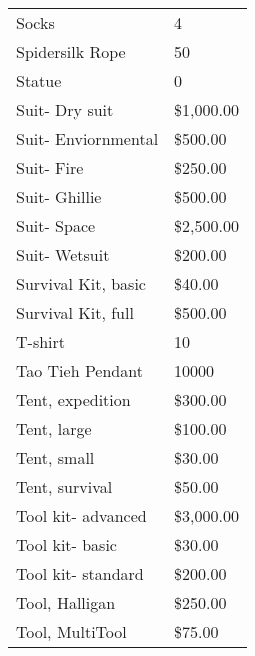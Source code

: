 \documentclass[twoside]{book}
\begin{document}
\begin{longtable}{p{1.25in}l}
  \raggedright
           Socks 
  &
   4 
  \tabularnewline
      
  \raggedright
           Spidersilk Rope 
  &
   50 
  \tabularnewline
      
  \raggedright
           Statue 
  &
   0 
  \tabularnewline
      
  \raggedright
           Suit- Dry suit 
  &
   \$1,000.00 
  \tabularnewline
      
  \raggedright
           Suit- Enviornmental 
  &
   \$500.00 
  \tabularnewline
      
  \raggedright
           Suit- Fire 
  &
   \$250.00 
  \tabularnewline
      
  \raggedright
           Suit- Ghillie 
  &
   \$500.00 
  \tabularnewline
      
  \raggedright
           Suit- Space 
  &
   \$2,500.00 
  \tabularnewline
      
  \raggedright
           Suit- Wetsuit 
  &
   \$200.00 
  \tabularnewline
      
  \raggedright
           Survival Kit, basic 
  &
   \$40.00 
  \tabularnewline
      
  \raggedright
           Survival Kit, full 
  &
   \$500.00 
  \tabularnewline
      
  \raggedright
           T-shirt 
  &
   10 
  \tabularnewline
      
  \raggedright
           Tao Tieh Pendant 
  &
   10000 
  \tabularnewline
      
  \raggedright
           Tent, expedition 
  &
   \$300.00 
  \tabularnewline
      
  \raggedright
           Tent, large 
  &
   \$100.00 
  \tabularnewline
      
  \raggedright
           Tent, small 
  &
   \$30.00 
  \tabularnewline
      
  \raggedright
           Tent, survival 
  &
   \$50.00 
  \tabularnewline
      
  \raggedright
           Tool kit- advanced 
  &
   \$3,000.00 
  \tabularnewline
      
  \raggedright
           Tool kit- basic 
  &
   \$30.00 
  \tabularnewline
      
  \raggedright
           Tool kit- standard 
  &
   \$200.00 
  \tabularnewline
      
  \raggedright
           Tool, Halligan 
  &
   \$250.00 
  \tabularnewline
      
  \raggedright
           Tool, MultiTool 
  &
   \$75.00 
  \tabularnewline
      

\end{longtable}
\end{document}
